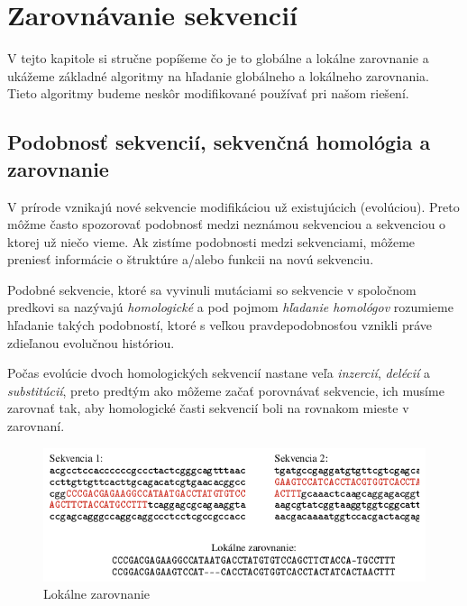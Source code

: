 \chapter{Zarovnávanie sekvencií}

V tejto kapitole si stručne popíšeme čo je to globálne a lokálne zarovnanie a ukážeme základné algoritmy na hľadanie globálneho a lokálneho zarovnania. Tieto algoritmy budeme neskôr modifikované používať pri našom riešení.

\section{Podobnosť sekvencií, sekvenčná homológia a zarovnanie}
V prírode vznikajú nové sekvencie modifikáciou už existujúcich (evolúciou). Preto môžme často spozorovať podobnosť medzi neznámou sekvenciou a sekvenciou o ktorej už niečo vieme. Ak zistíme podobnosti medzi sekvenciami, môžeme preniesť informácie o štruktúre a/alebo funkcii na novú sekvenciu.

Podobné sekvencie, ktoré sa vyvinuli mutáciami so sekvencie v spoločnom predkovi sa nazývajú \textit{homologické} a pod pojmom \textit{hľadanie homológov} rozumieme hľadanie takých podobností, ktoré s veľkou pravdepodobnosťou vznikli práve zdieľanou evolučnou históriou.



Počas evolúcie dvoch homologických sekvencií nastane veľa \textit{inzercií}, \textit{delécií} a \textit{substitúcií}, preto predtým ako môžeme začať porovnávať sekvencie, ich musíme zarovnať tak, aby homologické časti sekvencií boli na rovnakom mieste v zarovnaní.
\cite{durbin, skripta}

\begin{figure}[hbtp]
    \centering
    \includegraphics[width=\textwidth]{images/zarovnanie}
    \caption{Lokálne zarovnanie}    
    \label{fig:alignment_example}
\end{figure}


